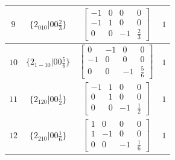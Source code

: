 \documentclass[fleqn,8pt]{jsarticle}
\begin{document}
\begin{longtable}{cccc}
$ 9 $ & $ \{2{}_{010}|0 0 \frac{2}{3}\} $ & $ \begin{bmatrix} -1 & 0 & 0 & 0 \\ -1 & 1 & 0 & 0 \\ 0 & 0 & -1 & \frac{2}{3} \end{bmatrix} $ & $ 1 $ \\ \hline
$ 10 $ & $ \{2{}_{1-10}|0 0 \frac{5}{6}\} $ & $ \begin{bmatrix} 0 & -1 & 0 & 0 \\ -1 & 0 & 0 & 0 \\ 0 & 0 & -1 & \frac{5}{6} \end{bmatrix} $ & $ 1 $ \\ \hline
$ 11 $ & $ \{2{}_{120}|0 0 \frac{1}{2}\} $ & $ \begin{bmatrix} -1 & 1 & 0 & 0 \\ 0 & 1 & 0 & 0 \\ 0 & 0 & -1 & \frac{1}{2} \end{bmatrix} $ & $ 1 $ \\ \hline
$ 12 $ & $ \{2{}_{210}|0 0 \frac{1}{6}\} $ & $ \begin{bmatrix} 1 & 0 & 0 & 0 \\ 1 & -1 & 0 & 0 \\ 0 & 0 & -1 & \frac{1}{6} \end{bmatrix} $ & $ 1 $ \\
\end{longtable}
\end{document}
